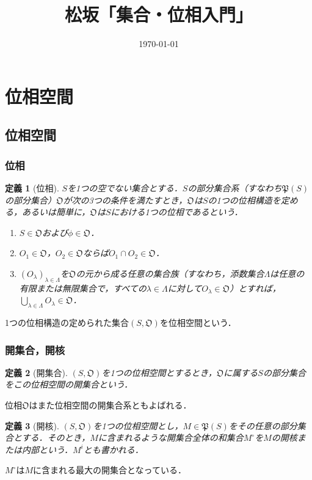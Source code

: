 \documentclass[a4paper,10pt,uplatex]{jsarticle}
\numberwithin{equation}{section}
\theoremstyle{mystyle}
\newtheorem{dfn}{定義}[section]
\newcommand{\gO}{\mathfrak{O}}
\newcommand{\gP}{\mathfrak{P}}
\begin{document}
\title{松坂「集合・位相入門」}
\author{}
\date{\today}
\maketitle

\section{位相空間}
\subsection{位相空間}
\subsubsection{位相}
\begin{dfn}[位相]
    $S$を1つの空でない集合とする．$S$の部分集合系（すなわち$\gP(S)$の部分集合）$\gO$が次の3つの条件を満たすとき，$\gO$は$S$の1つの位相構造を定める，あるいは簡単に，$\gO$は$S$における1つの位相であるという．
    \begin{enumerate}
        \item $S\in\gO$および$\phi\in\gO$． \label{dfn:位相の条件1}
        \item $O_1\in\gO$，$O_2\in\gO$ならば$O_1\cap O_2\in\gO$． \label{dfn:位相の条件2}
        \item $(O_\lambda)_{\lambda\in\Lambda}$を$\gO$の元から成る任意の集合族（すなわち，添数集合$\Lambda$は任意の有限または無限集合で，すべての$\lambda\in\Lambda$に対して$O_\lambda\in\gO$）とすれば，$\bigcup_{\lambda\in\Lambda} O_\lambda \in \gO$． \label{dfn:位相の条件3}
    \end{enumerate}
\end{dfn}

1つの位相構造の定められた集合$(S,\gO)$を位相空間という．

\subsubsection{開集合，開核}
\begin{dfn}[開集合]
    $(S,\gO)$を1つの位相空間とするとき，$\gO$に属する$S$の部分集合をこの位相空間の開集合という．
\end{dfn}
位相$\gO$はまた位相空間の開集合系ともよばれる．

\begin{dfn}[開核]
    $(S,\gO)$を1つの位相空間とし，$M\in \gP(S)$をその任意の部分集合とする．そのとき，$M$に含まれるような開集合全体の和集合$M^\circ$を$M$の開核または内部という．$M^i$とも書かれる．
\end{dfn}
$M^\circ$は$M$に含まれる最大の開集合となっている．
\end{document}
